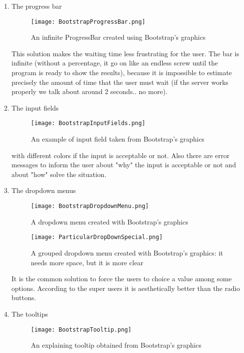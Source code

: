 \begin{enumerate}
\item The progress bar

\begin{figure}[H]
\centering
\texttt{[image: BootstrapProgressBar.png]} 
\caption{An infinite ProgressBar created using Bootstrap's graphics}
\end{figure}

This solution makes the waiting time less frustrating for the user. The bar is infinite (without a percentage, it go on like an endless screw until the program is ready to show the results), because it is impossible to estimate precisely the amount of time that the user must wait (if the server works properly we talk about around 2 seconds.. no more).

\newpage

\item The input fields

\begin{figure}[H]
\centering
\texttt{[image: BootstrapInputFields.png]} 
\caption{An example of input field taken from Bootstrap's graphics}
\end{figure}

with different colors if the input is acceptable or not. Also there are error messages to inform the user about "why" the input is acceptable or not and about "how" solve the situation.


\item The dropdown menus

\begin{figure}[H]
\centering
\texttt{[image: BootstrapDropdownMenu.png]} 
\caption{A dropdown menu created with Bootstrap's graphics}
\end{figure}


\begin{figure}[H]
\centering
\texttt{[image: ParticularDropDownSpecial.png]} 
\caption{A grouped dropdown menu created with Bootstrap's graphics: it needs more space, but it is more clear}
\end{figure}

It is the common solution to force the users to choice a value among some options. According to the super users it is aesthetically better than the radio buttons.

\item The tooltips

\begin{figure}[H]
\centering
\texttt{[image: BootstrapTooltip.png]} 
\caption{An explaining tooltip obtained from Bootstrap's graphics}
\end{figure}


\end{enumerate}
